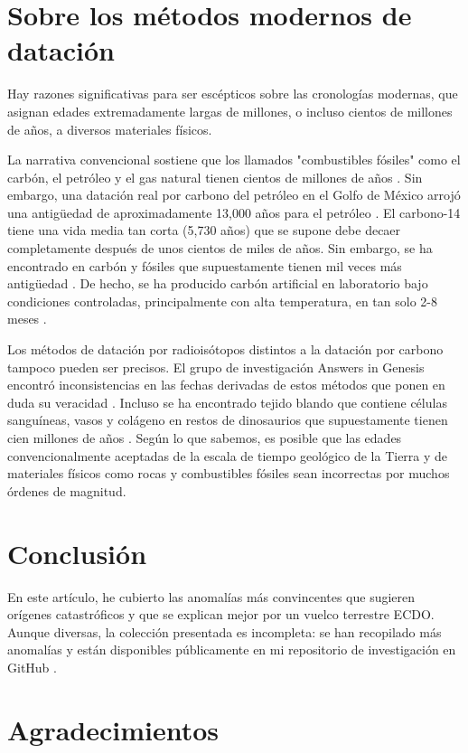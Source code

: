 \documentclass[10pt,twocolumn,letterpaper]{article}
\begin{document}
\section{Sobre los métodos modernos de datación}

Hay razones significativas para ser escépticos sobre las cronologías modernas, que asignan edades extremadamente largas de millones, o incluso cientos de millones de años, a diversos materiales físicos.

La narrativa convencional sostiene que los llamados "combustibles fósiles" como el carbón, el petróleo y el gas natural tienen cientos de millones de años \cite{104}. Sin embargo, una datación real por carbono del petróleo en el Golfo de México arrojó una antigüedad de aproximadamente 13,000 años para el petróleo \cite{105}. El carbono-14 tiene una vida media tan corta (5,730 años) que se supone debe decaer completamente después de unos cientos de miles de años. Sin embargo, se ha encontrado en carbón y fósiles que supuestamente tienen mil veces más antigüedad \cite{106}. De hecho, se ha producido carbón artificial en laboratorio bajo condiciones controladas, principalmente con alta temperatura, en tan solo 2-8 meses \cite{107}.

Los métodos de datación por radioisótopos distintos a la datación por carbono tampoco pueden ser precisos. El grupo de investigación Answers in Genesis encontró inconsistencias en las fechas derivadas de estos métodos que ponen en duda su veracidad \cite{108}. Incluso se ha encontrado tejido blando que contiene células sanguíneas, vasos y colágeno en restos de dinosaurios que supuestamente tienen cien millones de años \cite{109,110}. Según lo que sabemos, es posible que las edades convencionalmente aceptadas de la escala de tiempo geológico de la Tierra y de materiales físicos como rocas y combustibles fósiles sean incorrectas por muchos órdenes de magnitud.

\section{Conclusión}

En este artículo, he cubierto las anomalías más convincentes que sugieren orígenes catastróficos y que se explican mejor por un vuelco terrestre ECDO. Aunque diversas, la colección presentada es incompleta: se han recopilado más anomalías y están disponibles públicamente en mi repositorio de investigación en GitHub \cite{2}.

\section{Agradecimientos}
\end{document}
